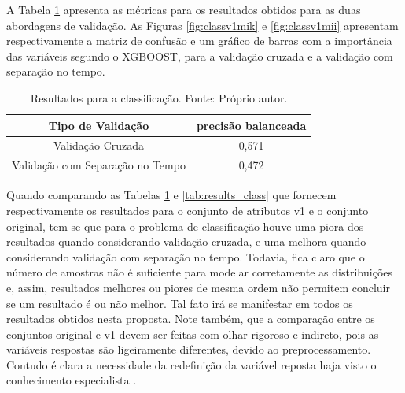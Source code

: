 A Tabela \ref{tab:results_v1_class} apresenta as métricas para os resultados obtidos para as duas abordagens de validação. As Figuras \ref{fig:classv1mik} e \ref{fig:classv1mii} apresentam respectivamente a matriz de confusão e um gráfico de barras com a importância das variáveis segundo o XGBOOST, para a validação cruzada e a validação com separação no tempo.

\begin{table}[H]
\begin{center}
\begin{tabular}{|c|c|}
\hline
Tipo de Validação & precisão balanceada   \\ \hline
Validação Cruzada                   & 0,571    \\ \hline
Validação com Separação no Tempo    & 0,472     \\ \hline
\end{tabular}
\end{center}
\vspace{12pt}
\caption{Resultados para a classificação. Fonte: Próprio autor.}
\label{tab:results_v1_class}
\end{table}

Quando comparando as Tabelas \ref{tab:results_v1_class} e \ref{tab:results_class} que fornecem respectivamente os resultados para o conjunto de atributos v1 e o conjunto original, tem-se que para o problema de classificação houve uma piora dos resultados quando considerando validação cruzada, e uma melhora quando considerando validação com separação no tempo. Todavia, fica claro que o número de amostras não é suficiente para modelar corretamente as distribuições e, assim, resultados melhores ou piores de mesma ordem não permitem concluir se um resultado é ou não melhor. Tal fato irá se manifestar em todos os resultados obtidos nesta proposta. Note também, que a comparação entre os conjuntos original e v1 devem ser feitas com olhar rigoroso e indireto, pois as variáveis respostas são ligeiramente diferentes, devido ao preprocessamento. Contudo é clara a necessidade da redefinição da variável reposta haja visto o conhecimento especialista \cite{MUELLA:2008}.

